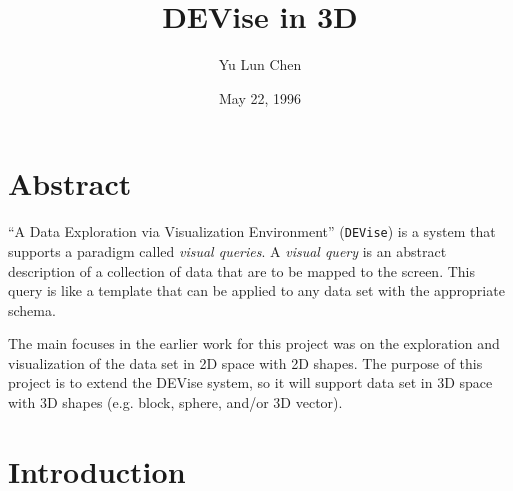 
%





\renewcommand{\textwidth}{5.9in}
\oddsidemargin 0.30in
\evensidemargin 0.30in
\newenvironment{codespace}{\baselineskip 6pt }{}



\title{\bf{DEVise in 3D}}
\author{Yu Lun Chen}
\date{May 22, 1996}



\maketitle

\section{Abstract}

``A Data Exploration via Visualization Environment'' ({\tt DEVise}) is a
system that supports a paradigm called {\em visual queries}.  A
{\em visual query} is an abstract description of a collection of 
data that are to be mapped to the screen.  This query
is like a template that can be applied to any data set with the
appropriate schema.

The main focuses in the earlier work for this project was on the 
exploration and visualization of the data set in 2D space with 2D 
shapes.  The purpose of this project is to extend the DEVise 
system, so it will support data set in 3D space with 3D 
shapes (e.g. block, sphere, and/or 3D vector).

\section{Introduction}

